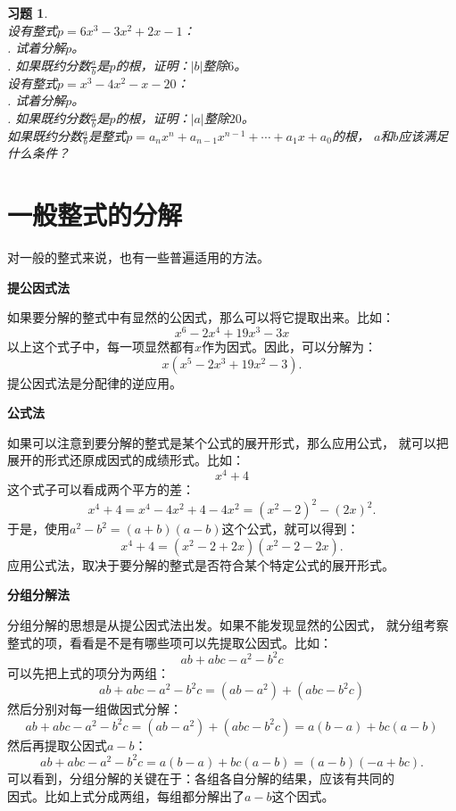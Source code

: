 \documentclass[12pt,UTF8]{ctexbook}
\newtheorem{xt}{习题}[section]
\begin{document}
\begin{xt}\label{xt:2-1-0}
    \mbox{}\\
    设有整式$p = 6x^3 - 3x^2 + 2x - 1$：\\
    . 试着分解$p$。\\
    . 如果既约分数$\frac{a}{b}$是$p$的根，证明：$|b|$整除$6$。\\
    设有整式$p = x^3 - 4x^2 - x - 20 $：\\
    . 试着分解$p$。\\
    . 如果既约分数$\frac{a}{b}$是$p$的根，证明：$|a|$整除$20$。\\
    如果既约分数$\frac{a}{b}$是整式$p = a_nx^n + a_{n-1}x^{n-1} + \cdots + a_1 x + a_0$的根，
    $a$和$b$应该满足什么条件？
\end{xt}

\section{一般整式的分解}
对一般的整式来说，也有一些普遍适用的方法。

\noindent \textbf{提公因式法}

\indent 如果要分解的整式中有显然的公因式，那么可以将它提取出来。比如：
$$ x^6 - 2x^4 + 19 x^3 -3x$$
\indent 以上这个式子中，每一项显然都有$x$作为因式。因此，可以分解为：
$$ x(x^5 - 2x^3 + 19x^2 - 3).$$
\indent 提公因式法是分配律的逆应用。

\noindent \textbf{公式法}

\indent 如果可以注意到要分解的整式是某个公式的展开形式，那么应用公式，
\indent 就可以把展开的形式还原成因式的成绩形式。比如： 
$$x^4 + 4$$
\indent 这个式子可以看成两个平方的差：
$$ x^4 + 4 = x^4 - 4x^2 + 4 - 4x^2 = (x^2 - 2)^2- (2x)^2.$$
\indent 于是，使用$a^2 - b^2 = (a + b)(a - b)$这个公式，就可以得到：
$$x^4 + 4 = (x^2 - 2 + 2x)(x^2 -2 -2x).$$
\indent 应用公式法，取决于要分解的整式是否符合某个特定公式的展开形式。

\noindent \textbf{分组分解法}

\indent 分组分解的思想是从提公因式法出发。如果不能发现显然的公因式，
\indent 就分组考察整式的项，看看是不是有哪些项可以先提取公因式。比如：
$$ ab + abc - a^2 - b^2c$$
\indent 可以先把上式的项分为两组：
$$ ab + abc - a^2 - b^2c = (ab - a^2) + (abc - b^2c)$$
\indent 然后分别对每一组做因式分解：
$$ ab + abc - a^2 - b^2c = (ab - a^2) + (abc - b^2c) = a(b - a) + bc(a - b)$$
\indent 然后再提取公因式$a - b$：
$$ ab + abc - a^2 - b^2c = a(b - a) + bc(a - b) = (a - b)(-a + bc).$$
\indent 可以看到，分组分解的关键在于：各组各自分解的结果，应该有共同的\\
\indent 因式。比如上式分成两组，每组都分解出了$a - b$这个因式。
\end{document}
